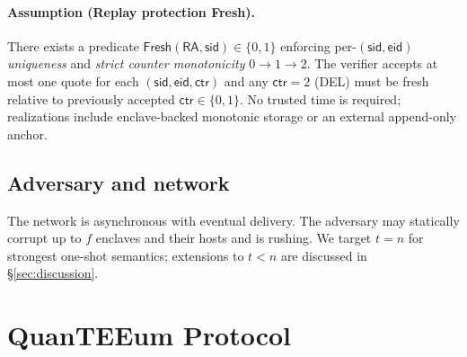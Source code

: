 \documentclass[runningheads,orivec]{llncs}
\newcommand{\prot}{\textsf{QuanTEEum}}
\begin{document}
\paragraph{Assumption (Replay protection \textsf{Fresh}).}
There exists a predicate $\textsf{Fresh}(\mathsf{RA},\mathsf{sid})\!\in\!\{0,1\}$ enforcing per-$(\mathsf{sid},\mathsf{eid})$ \emph{uniqueness} and \emph{strict counter monotonicity} $0\!\rightarrow\!1\!\rightarrow\!2$. The verifier accepts at most one quote for each $(\mathsf{sid},\mathsf{eid},\mathsf{ctr})$ and any $\mathsf{ctr}{=}2$ (DEL) must be fresh relative to previously accepted $\mathsf{ctr}\in\{0,1\}$. No trusted time is required; realizations include enclave-backed monotonic storage or an external append-only anchor.

\subsection{Adversary and network}
The network is asynchronous with eventual delivery. The adversary may statically corrupt up to $f$ enclaves and their hosts and is rushing. We target $t=n$ for strongest one-shot semantics; extensions to $t<n$ are discussed in \S\ref{sec:discussion}.

\section{\prot{} Protocol}\label{sec:protocol}
\end{document}
